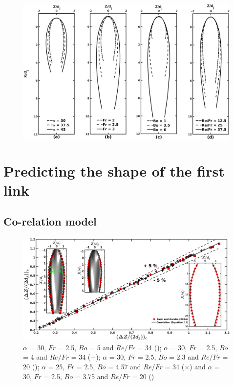 \documentclass[%
aip,
sd,%
amsmath,amssymb,
preprint,%
author-year,%
]{revtex4-1}
\begin{document}
\begin{figure}
	\centering
	\includegraphics[width=\linewidth]{finalContour}
	\caption{}
	\label{Figure::finalContours}
\end{figure}
\lipsum
\section{Predicting the shape of the first link}
\lipsum[1]
\subsection{Co-relation model}
\lipsum[1]
\begin{figure}[H]
	\centering
	\includegraphics[width=\linewidth]{corelatehx}
	\caption{$\alpha$ = 30, $Fr$ = 2.5, $Bo$ = 5 and $Re/Fr$ = 34 (\protect\MarkerSquareRed); $\alpha$ = 30, $Fr$ = 2.5, $Bo$ = 4 and $Re/Fr$ = 34 (+); $\alpha$ = 30, $Fr$ = 2.5, $Bo$ = 2.3 and $Re/Fr$ = 20 (\protect \MarkerDiamondBlack); $\alpha$ = 25, $Fr$ = 2.5, $Bo$ = 4.57 and $Re/Fr$ = 34 ($\times$) and $\alpha$ = 30, $Fr$ = 2.5, $Bo$ = 3.75 and $Re/Fr$ = 20 (\protect \MarkerCircleRed) }
	\label{Figure::corelatehx}
\end{figure}
\lipsum[1]
\end{document}
